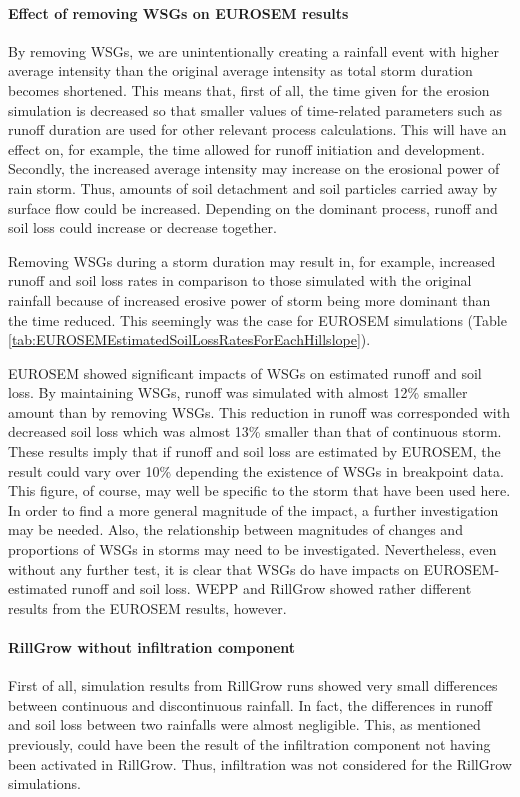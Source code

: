 \paragraph{Effect of removing WSGs on EUROSEM results} By removing WSGs, we
are unintentionally creating a rainfall event with higher average intensity than
the original average intensity as total storm duration becomes shortened. This
means that, first of all, the time given for the erosion simulation is decreased
so that smaller values of time-related parameters such as runoff duration are
used for other relevant process calculations. This will have an effect on, for
example, the time allowed for runoff initiation and development. Secondly, the
increased average intensity may increase on the erosional power of rain
storm. Thus, amounts of soil detachment and soil particles carried away by
surface flow could be increased. Depending on the dominant process, runoff and
soil loss could increase or decrease together.

Removing WSGs during a storm duration may result in, for example, increased
runoff and soil loss rates in comparison to those simulated with the original
rainfall because of increased erosive power of storm being more dominant than
the time reduced. This seemingly was the case for EUROSEM simulations (Table
\ref{tab:EUROSEMEstimatedSoilLossRatesForEachHillslope}).

EUROSEM showed significant impacts of WSGs on estimated runoff and soil loss. By
maintaining WSGs, runoff was simulated with almost 12\% smaller amount than by
removing WSGs. This reduction in runoff was corresponded with decreased soil
loss which was almost 13\% smaller than that of continuous storm. These results
imply that if runoff and soil loss are estimated by EUROSEM, the result could
vary over 10\% depending the existence of WSGs in breakpoint data. This figure,
of course, may well be specific to the storm that have been used here. In order
to find a more general magnitude of the impact, a further investigation may be
needed. Also, the relationship between magnitudes of changes and proportions of
WSGs in storms may need to be investigated. Nevertheless, even without any
further test, it is clear that WSGs do have impacts on EUROSEM-estimated runoff
and soil loss.
WEPP and RillGrow showed rather different results from the EUROSEM results,
however.

\paragraph{RillGrow without infiltration component} First of all, simulation
results from RillGrow runs showed very small differences between continuous and
discontinuous rainfall. In fact, the differences in runoff and soil loss between
two rainfalls were almost negligible. This, as mentioned previously, could have
been the result of the infiltration component not having been activated in
RillGrow. Thus, infiltration was not considered for the RillGrow simulations.

